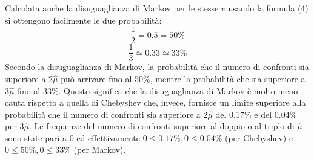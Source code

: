 \documentclass[12pt]{article}
\begin{document}
Calcolata anche la disuguaglianza di Markov per le stesse $v$ usando la
formula (4) si ottengono facilmente le due probabilità:
\begin{equation*}
    \frac{1}{2} = 0.5 = 50\%
\end{equation*}
\begin{equation*}
    \frac{1}{3} \simeq 0.33 \simeq 33\%
\end{equation*}
Secondo la disuguaglianza di Markov, la probabilità che il numero di 
confronti sia superiore a $2\hat{\mu}$ può arrivare fino al 50\%, mentre 
la probabilità che sia superiore a $3\hat{\mu}$ fino al 33\%. Questo 
significa che la disuguaglianza di Markov è molto meno cauta rispetto a 
quella di Chebyshev che, invece, fornisce un limite superiore alla 
probabilità che il numero di confronti sia superiore a $2\hat{\mu}$ del 
0.17\% e del 0.04\% per $3\hat{\mu}$.
Le frequenze del numero di confronti superiore al doppio o al triplo di 
$\hat{\mu}$ sono state pari a 0 ed effettivamente 
$0\leq 0.17\%,0\leq 0.04\%$ (per Chebyshev) e $0\leq 50\%,0\leq 33\%$ 
(per Markov).

\end{document}
